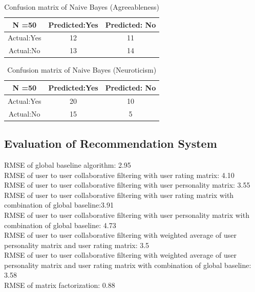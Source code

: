 \begin{table}[!ht]
\centering
\begin{tabular}{ |c|c|c| }
 \hline
 N =50 & Predicted:Yes & Predicted: No \\
 \hline
 Actual:Yes&12 & 11 \\
 \hline
 Actual:No&13 & 14 \\
 \hline
\end{tabular}
 \caption{Confusion matrix of Naive Bayes (Agreeableness)}
\end{table}

\begin{table}[!ht]
\centering
\begin{tabular}{ |c|c|c| }
 \hline
 N =50 & Predicted:Yes & Predicted: No \\
 \hline
 Actual:Yes&20 & 10 \\
 \hline
 Actual:No&15 & 5 \\
 \hline
\end{tabular}
 \caption{Confusion matrix of Naive Bayes (Neuroticism)}
\end{table}


\subsection{Evaluation of Recommendation System}
RMSE of global baseline algorithm: 2.95\\
RMSE of user to user collaborative filtering with user rating matrix: 4.10\\
RMSE of user to user collaborative filtering with user personality matrix: 3.55\\
RMSE of user to user collaborative filtering with user rating matrix with combination of global baseline:3.91 \\
RMSE of user to user collaborative filtering with user personality matrix with combination of global baseline: 4.73\\
RMSE of user to user collaborative filtering with weighted average of user personality matrix and user rating matrix: 3.5\\
RMSE of user to user collaborative filtering with weighted average of user personality matrix and user rating matrix with combination of global baseline: 3.58\\
RMSE of matrix factorization: 0.88\\



